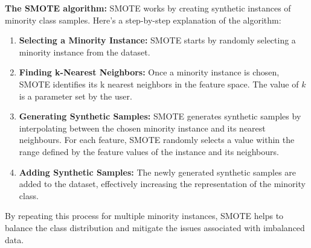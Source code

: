     \textbf{The SMOTE algorithm:} SMOTE works by creating synthetic instances of minority class samples. Here's a step-by-step explanation of the algorithm:

    \begin{enumerate}
        \item \textbf{Selecting a Minority Instance:} SMOTE starts by randomly selecting a minority instance from the dataset.
        \item \textbf{Finding k-Nearest Neighbors:} Once a minority instance is chosen, SMOTE identifies its k nearest neighbors in the feature space. The value of $k$ is a parameter set by the user.
        \item \textbf{Generating Synthetic Samples:} SMOTE generates synthetic samples by interpolating between the chosen minority instance and its nearest neighbours. For each feature, SMOTE randomly selects a value within the range defined by the feature values of the instance and its neighbours.
        \item \textbf{Adding Synthetic Samples:} The newly generated synthetic samples are added to the dataset, effectively increasing the representation of the minority class.
    \end{enumerate}
    
    By repeating this process for multiple minority instances, SMOTE helps to balance the class distribution and mitigate the issues associated with imbalanced data.